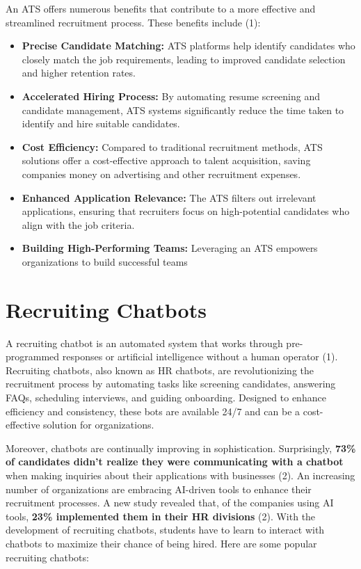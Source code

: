 \documentclass[
]{book}
\begin{document}
An ATS offers numerous benefits that contribute to a more effective and streamlined recruitment process. These benefits include (1):

\begin{itemize}
\item
  \textbf{Precise Candidate Matching:} ATS platforms help identify candidates who closely match the job requirements, leading to improved candidate selection and higher retention rates.
\item
  \textbf{Accelerated Hiring Process:} By automating resume screening and candidate management, ATS systems significantly reduce the time taken to identify and hire suitable candidates.
\item
  \textbf{Cost Efficiency:} Compared to traditional recruitment methods, ATS solutions offer a cost-effective approach to talent acquisition, saving companies money on advertising and other recruitment expenses.
\item
  \textbf{Enhanced Application Relevance:} The ATS filters out irrelevant applications, ensuring that recruiters focus on high-potential candidates who align with the job criteria.
\item
  \textbf{Building High-Performing Teams:} Leveraging an ATS empowers organizations to build successful teams
\end{itemize}

\hypertarget{recruiting-chatbots}{%
\chapter{Recruiting Chatbots}\label{recruiting-chatbots}}

A recruiting chatbot is an automated system that works through pre-programmed responses or artificial intelligence without a human operator (1). Recruiting chatbots, also known as HR chatbots, are revolutionizing the recruitment process by automating tasks like screening candidates, answering FAQs, scheduling interviews, and guiding onboarding. Designed to enhance efficiency and consistency, these bots are available 24/7 and can be a cost-effective solution for organizations.

Moreover, chatbots are continually improving in sophistication. Surprisingly, \textbf{73\% of candidates didn't realize they were communicating with a chatbot} when making inquiries about their applications with businesses (2). An increasing number of organizations are embracing AI-driven tools to enhance their recruitment processes. A new study revealed that, of the companies using AI tools, \textbf{23\% implemented them in their HR divisions} (2). With the development of recruiting chatbots, students have to learn to interact with chatbots to maximize their chance of being hired. Here are some popular recruiting chatbots:
\end{document}
